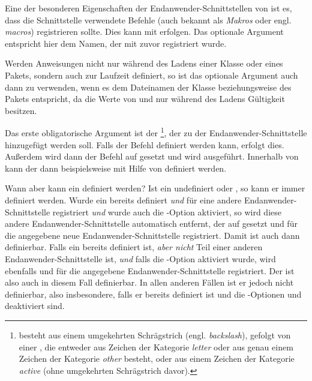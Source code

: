 \begin{Declaration}
\end{Declaration}
Eine der besonderen Eigenschaften der Endanwender-Schnittstellen von
 ist es, dass die Schnittstelle verwendete Befehle (auch
bekannt als \emph{Makros} oder engl. \emph{macros}) registrieren sollte. Dies
kann mit  erfolgen. Das optionale Argument
 entspricht hier dem Namen, der mit
 zuvor registriert wurde.

Werden Anweisungen nicht nur während des Ladens einer
Klasse oder eines Pakets, sondern auch zur Laufzeit definiert, so ist das
optionale Argument auch dann zu verwenden, wenn es dem Dateinamen der Klasse
beziehungsweise des Pakets entspricht, da die Werte von  und
 nur während des Ladens Gültigkeit besitzen.

Das erste obligatorische Argument ist der
\footnote{ besteht aus einem umgekehrten
  Schrägstrich (engl. \emph{backslash}), gefolgt von einer
  , die entweder aus Zeichen der Kategorie \emph{letter}
  oder aus genau einem Zeichen der Kategorie \emph{other} besteht, oder aus
  einem Zeichen der Kategorie \emph{active} (ohne umgekehrten Schrägstrich
  davor).}, der zu der Endanwender-Schnittstelle hinzugefügt werden
soll. Falls der Befehl definiert werden kann, erfolgt dies. Außerdem wird dann
der Befehl auf  gesetzt und  wird
ausgeführt. Innerhalb von  kann der  dann
beispielsweise mit Hilfe von  definiert werden.

Wann aber kann ein  definiert
werden? Ist ein  undefiniert oder , so kann er
immer definiert werden. Wurde ein  bereits definiert \emph{und}
für eine andere Endanwender-Schnittstelle registriert \emph{und} wurde auch die
\KOMAScript-Option  aktiviert, so wird diese
andere Endanwender-Schnittstelle automatisch entfernt, der  auf
 gesetzt und für die angegebene neue Endanwender-Schnittstelle
registriert. Damit ist  auch dann definierbar. Falls ein
 bereits definiert ist, \emph{aber nicht} Teil einer anderen
Endanwender-Schnittstelle ist, \emph{und} falls die \KOMAScript-Option
 aktiviert wurde, wird  ebenfalls
 und für die angegebene Endanwender-Schnittstelle
registriert. Der  ist also auch in diesem Fall definierbar. In
allen anderen Fällen ist er jedoch nicht definierbar, also insbesondere, falls
er bereits definiert ist und die \KOMAScript-Optionen
 und  deaktiviert sind.


